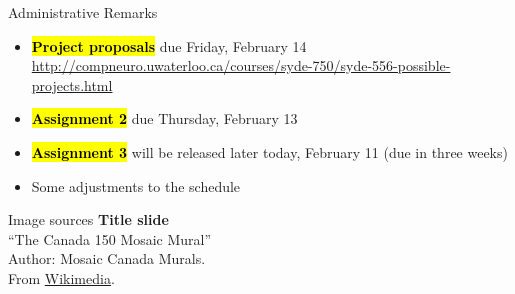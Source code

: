 \documentclass[handout,aspectratio=169]{beamer}
\begin{document}
	\begin{frame}{Administrative Remarks}
	\begin{itemize}
		\item \textbf{\hl{Project proposals}} due Friday, February 14\\ \url{http://compneuro.uwaterloo.ca/courses/syde-750/syde-556-possible-projects.html}\\[0.5cm]
		\item \textbf{\hl{Assignment 2}} due Thursday, February 13\\[0.5cm]
		\item \textbf{\hl{Assignment 3}} will be released later today, February 11 (due in three weeks)\\[0.5cm]
		\item Some adjustments to the schedule
	\end{itemize}
	\end{frame}


	\backupbegin

	\begin{frame}[noframenumbering]{Image sources}
		\small
		\textbf{Title slide}\\\enquote{The Canada 150 Mosaic Mural}\\Author: Mosaic Canada Murals.\\From \href{https://commons.wikimedia.org/wiki/File:Canada_150_Mosaic_Engine.jpg}{Wikimedia}.
	\end{frame}


	\backupend
	
\end{document}
